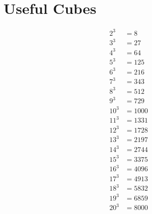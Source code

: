 
\section*{Useful Cubes}
\begin{align*}
2^3  & = 8\\
3^3  & = 27\\
4^3  & = 64\\
5^3  & = 125\\
6^3  & = 216\\
7^3  & = 343\\
8^3  & = 512\\
9^3  & = 729\\
10^3 & = 1000\\
11^3 & = 1331\\
12^3 & = 1728\\
13^3 & = 2197\\
14^3 & = 2744\\
15^3 & = 3375\\
16^3 & = 4096\\
17^3 & = 4913\\
18^3 & = 5832\\
19^3 & = 6859\\
20^3 & = 8000
\end{align*}
